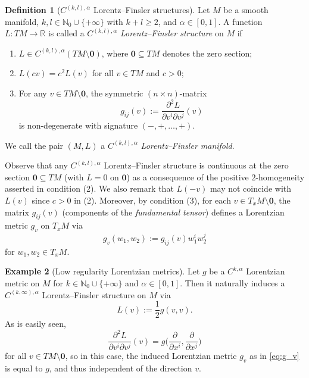 \documentclass[a4paper,11pt]{article}
\numberwithin{equation}{section}
\theoremstyle{definition}
\newtheorem{Definition}{Definition}[section]
\newtheorem{Example}[Definition]{Example}
\theoremstyle{plain}
\newcommand{\R}{\mathbb R}
\newcommand{\N}{\mathbb N}
\begin{document}
\begin{Definition}[$C^{(k,l),\alpha}$ Lorentz--Finsler structures]
\label{Definition: Lorentz Finsler structure}
Let $M$ be a smooth manifold, $k,l \in \mathbb{N}_0 \cup \{+\infty\}$ with $k+l \geq 2$, and $\alpha \in [0,1]$. A function $L: TM \to \R$ is called a $C^{(k,l),\alpha}$ \emph{Lorentz--Finsler structure} on $M$ if
\begin{enumerate}
    \item[(1)] $L \in C^{(k,l),\alpha}(TM \setminus \mathbf0)$, where $\mathbf{0} \subseteq TM$ denotes the zero section;
    \item[(2)] $L(cv) = c^2 L(v)$ for all $v \in TM$ and $c>0$;
    \item[(3)] For any $v \in TM \setminus \mathbf 0$, the symmetric $(n \times n)$-matrix
    \begin{equation*}
        g_{ij}(v) := \frac{\partial^2 L}{\partial v^i \partial v^j}(v)
    \end{equation*}
    is non-degenerate with signature $(-,+,\ldots,+)$.
\end{enumerate}
We call the pair $(M,L)$ a $C^{(k,l),\alpha}$ \emph{Lorentz--Finsler manifold}.
\end{Definition}

Observe that any $C^{(k,l),\alpha}$ Lorentz--Finsler structure is continuous at the zero section $\mathbf{0} \subseteq TM$ (with $L=0$ on $\mathbf{0}$) as a consequence of the positive $2$-homogeneity asserted in condition (2). 
We also remark that $L(-v)$ may not coincide with $L(v)$ since $c>0$ in (2).
Moreover, by condition (3), for each $v \in T_xM \setminus \mathbf{0}$, the matrix $g_{ij}(v)$ (components of the \emph{fundamental tensor}) defines a Lorentzian metric $g_v$ on $T_xM$ via
\begin{equation}\label{eq:g_v}
g_v(w_1,w_2) :=g_{ij}(v)w_1^i w_2^j
\end{equation}
for $w_1,w_2 \in T_xM$.

\begin{Example}[Low regularity Lorentzian metrics]
Let $g$ be a $C^{k,\alpha}$ Lorentzian metric on $M$ for $k \in \N_0 \cup \{+\infty\}$ and $\alpha \in [0,1]$. Then it naturally induces a $C^{(k,\infty), \alpha}$ Lorentz--Finsler structure on $M$ via
\begin{equation*}
    L(v):= \frac{1}{2}g(v,v).
\end{equation*}
As is easily seen,
\begin{equation*}
    \frac{\partial^2 L}{\partial v^i \partial v^j}(v) = g\biggl( \frac{\partial}{\partial x^i}, \frac{\partial}{\partial x^j} \biggr)
\end{equation*}
for all $v \in TM \setminus \mathbf{0}$, so in this case, the induced Lorentzian metric $g_v$ as in \eqref{eq:g_v} is equal to $g$, and thus independent of the direction $v$.
\end{Example}
\end{document}
